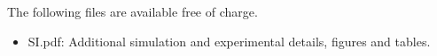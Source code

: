 \documentclass[journal=jctcce,manuscript=article]{achemso}
\begin{document}
\begin{suppinfo} 
 
 
The following files are available free of charge. 
\begin{itemize} 
  \item SI.pdf: Additional simulation and experimental details, figures and tables. 
\end{itemize} 
 
\end{suppinfo} 
 
 
 
 
\end{document}
